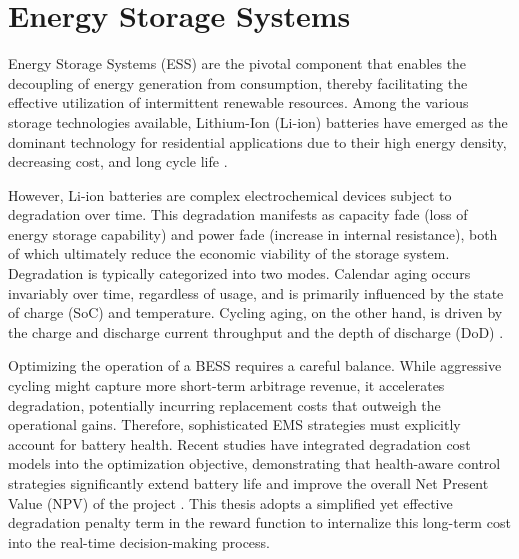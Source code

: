 
\section{Energy Storage Systems}

Energy Storage Systems (ESS) are the pivotal component that enables the decoupling of energy generation from consumption, thereby facilitating the effective utilization of intermittent renewable resources. Among the various storage technologies available, Lithium-Ion (Li-ion) batteries have emerged as the dominant technology for residential applications due to their high energy density, decreasing cost, and long cycle life \cite{Chen2009}.

However, Li-ion batteries are complex electrochemical devices subject to degradation over time. This degradation manifests as capacity fade (loss of energy storage capability) and power fade (increase in internal resistance), both of which ultimately reduce the economic viability of the storage system. Degradation is typically categorized into two modes. Calendar aging occurs invariably over time, regardless of usage, and is primarily influenced by the state of charge (SoC) and temperature. Cycling aging, on the other hand, is driven by the charge and discharge current throughput and the depth of discharge (DoD) \cite{Xu2018}.

Optimizing the operation of a BESS requires a careful balance. While aggressive cycling might capture more short-term arbitrage revenue, it accelerates degradation, potentially incurring replacement costs that outweigh the operational gains. Therefore, sophisticated EMS strategies must explicitly account for battery health. Recent studies have integrated degradation cost models into the optimization objective, demonstrating that health-aware control strategies significantly extend battery life and improve the overall Net Present Value (NPV) of the project \cite{Grimaldi2024}. This thesis adopts a simplified yet effective degradation penalty term in the reward function to internalize this long-term cost into the real-time decision-making process.
